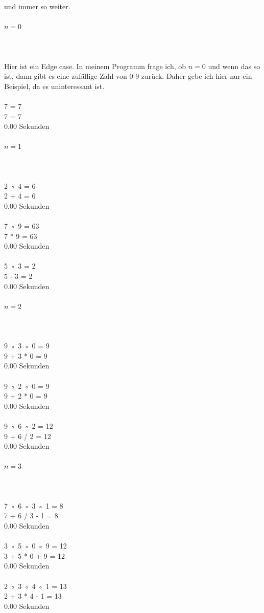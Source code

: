 \documentclass[a4paper,10pt,ngerman]{scrartcl}
\begin{document}
\noindent und immer so weiter.

\paragraph{$n=0$} \hrulefill
\\
\\
Hier ist ein Edge case. In meinem Programm frage ich, ob $n=0$ und wenn das so ist, dann gibt es eine zufällige Zahl von 0-9 zurück. Daher gebe ich hier nur ein Beispiel, da es uninteressant ist.
\\
\\
7 = 7\\
7 = 7\\
0.00 Sekunden\\
\paragraph{$n=1$} \hrulefill
\\
\\
2 ◦ 4 = 6\\
2 + 4 = 6\\
0.00 Sekunden\\
\\
7 ◦ 9 = 63\\
7 * 9 = 63\\
0.00 Sekunden\\
\\
5 ◦ 3 = 2\\
5 - 3 = 2\\
0.00 Sekunden\\
\paragraph{$n=2$} \hrulefill
\\
\\
9 ◦ 3 ◦ 0 = 9\\
9 + 3 * 0 = 9\\
0.00 Sekunden\\
\\
9 ◦ 2 ◦ 0 = 9\\
9 + 2 * 0 = 9\\
0.00 Sekunden\\
\\
9 ◦ 6 ◦ 2 = 12\\
9 + 6 / 2 = 12\\
0.00 Sekunden\\
\paragraph{$n=3$} \hrulefill
\\
\\
7 ◦ 6 ◦ 3 ◦ 1 = 8\\
7 + 6 / 3 - 1 = 8\\
0.00 Sekunden\\
\\
3 ◦ 5 ◦ 0 ◦ 9 = 12\\
3 + 5 * 0 + 9 = 12\\
0.00 Sekunden\\
\\
2 ◦ 3 ◦ 4 ◦ 1 = 13\\
2 + 3 * 4 - 1 = 13\\
0.00 Sekunden\\
\end{document}
